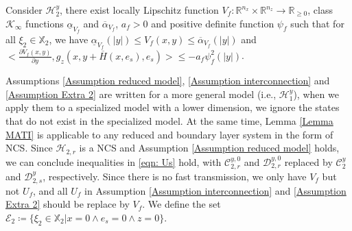 %
\begin{assum}
    Consider $\mathcal{H}_2^y$, there exist locally Lipschitz function $V_f: \mathbb{R}^{n_x} \times \mathbb{R}^{n_z}\rightarrow \mathbb{R}_{\geq 0}$, class $\mathcal{K}_\infty$ functions $\underline{\alpha}_{V_f}$ and $\overline{\alpha}_{V_f}$, $a_f>0$ and positive definite function $\psi_f$ such that for all $\xi_2 \in \mathbb{X}_2$, we have 
    $\underline{\alpha}_{V_f}\left(\left| y \right|\right)\leq {V_f}(x,y) \leq \overline{\alpha}_{V_f}\left(\left| y\right|\right)$ and $\big< \tfrac{\partial {V_f}(x,y)}{\partial y},g_z(x,y+ \overline{H}(x, e_s),e_s)  \big> \leq -a_f \psi_f^2 \left(| y |\right)$.  
    \label{Assumption Stable fast subsystem}
\end{assum}
Assumptions \ref{Assumption reduced model}, \ref{Assumption interconnection} and \ref{Assumption Extra 2} are written for a more general model (i.e., $\mathcal{H}_1^y$), when we apply them to a specialized model with a lower dimension, we ignore the states that do not exist in the specialized model. %
At the same time, Lemma \ref{Lemma MATI} is applicable to any reduced and boundary layer system in the form of NCS.
Since $\mathcal{H}_{2,r}$ is a NCS and Assumption \ref{Assumption reduced model} holds, we can conclude inequalities in \eqref{eqn: Us} hold, with $\mathcal{C}_{2,r}^{y,0}$ and $\mathcal{D}_{2,r}^{y,0}$ replaced by $\mathcal{C}_2^y$ and $\mathcal{D}_{2,s}^y$, respectively. Since there is no fast transmission, we only have $V_f$ but not $U_f$, and all $U_f$ in Assumption \ref{Assumption interconnection} and \ref{Assumption Extra 2} should be replace by $V_f$.
%
We define the set $\mathcal{E}_2 \coloneqq \{\xi_2 \in \mathbb{X}_2 | x=0 \wedge e_s = 0 \wedge z=0 \}$.
